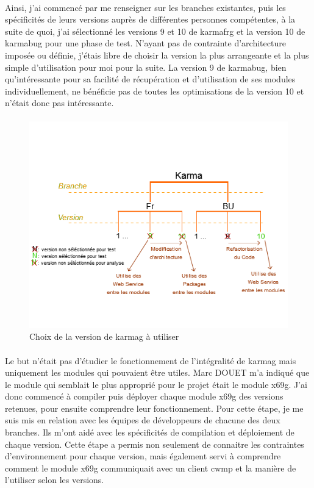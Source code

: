 \documentclass[12pt,a4paper]{report}
\begin{document}
\paragraph*{}Ainsi, j’ai commencé par me renseigner sur les branches existantes, puis
les spécificités de leurs versions auprès de différentes personnes compétentes, à la suite de quoi, j’ai sélectionné les versions 9 et 10 de \gls{karmafrg} et la version 10 de \gls{karmabug} pour une phase de test. N’ayant pas de contrainte d’architecture imposée ou définie, j’étais libre de choisir la version la plus arrangeante et la plus simple d’utilisation pour moi pour la suite. La version 9 de \gls{karmabug}, bien qu’intéressante pour sa facilité de récupération et d’utilisation de ses modules individuellement, ne bénéficie pas de toutes les optimisations de la version 10 et n’était donc pas intéressante.
\paragraph*{}
\begin{figure}[!ht]
    \center
    \includegraphics[scale=0.9]{./img/choix_karma.png}
    \caption{Choix de la version de \gls{karmag} à utiliser}
\end{figure}
\paragraph*{}Le but n’était pas d’étudier le fonctionnement de l’intégralité de \gls{karmag} mais uniquement les modules qui pouvaient être utiles. Marc DOUET m’a indiqué que le module qui semblait le plus approprié pour le projet était le module \gls{x69g}. J’ai donc commencé à compiler puis déployer chaque module \gls{x69g} des versions retenues, pour ensuite comprendre leur fonctionnement. Pour cette étape, je me suis mis en relation avec les équipes de développeurs de chacune des deux branches. Ils m’ont aidé avec les spécificités de compilation et déploiement de chaque version. Cette étape a permis non seulement de connaitre les contraintes d’environnement pour chaque version, mais également servi à comprendre comment le module \gls{x69g} communiquait avec un client \gls{cwmp} et la manière de l’utiliser selon les versions.
\end{document}
